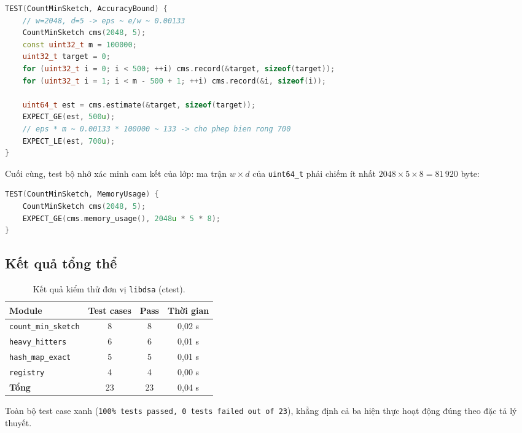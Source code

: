 \begin{lstlisting}[language=C++, caption={Xác nhận biên $(\varepsilon, \delta)$}, label=lst:test-bound]
TEST(CountMinSketch, AccuracyBound) {
    // w=2048, d=5 -> eps ~ e/w ~ 0.00133
    CountMinSketch cms(2048, 5);
    const uint32_t m = 100000;
    uint32_t target = 0;
    for (uint32_t i = 0; i < 500; ++i) cms.record(&target, sizeof(target));
    for (uint32_t i = 1; i < m - 500 + 1; ++i) cms.record(&i, sizeof(i));

    uint64_t est = cms.estimate(&target, sizeof(target));
    EXPECT_GE(est, 500u);
    // eps * m ~ 0.00133 * 100000 ~ 133 -> cho phep bien rong 700
    EXPECT_LE(est, 700u);
}
\end{lstlisting}

Cuối cùng, test bộ nhớ xác minh cam kết của lớp: ma trận $w \times d$ của \texttt{uint64\_t} phải chiếm ít nhất $2048 \times 5 \times 8 = 81\,920$ byte:

\begin{lstlisting}[language=C++, caption={Xác nhận memory usage}, label=lst:test-mem]
TEST(CountMinSketch, MemoryUsage) {
    CountMinSketch cms(2048, 5);
    EXPECT_GE(cms.memory_usage(), 2048u * 5 * 8);
}
\end{lstlisting}

\subsection{Kết quả tổng thể}

\begin{table}[H]
  \centering
  \caption{Kết quả kiểm thử đơn vị \texttt{libdsa} (ctest).}
  \label{tab:ctest-results}
  \begin{tabular}{@{}l c c c@{}}
    \toprule
    \textbf{Module} & \textbf{Test cases} & \textbf{Pass} & \textbf{Thời gian} \\
    \midrule
    \texttt{count\_min\_sketch} & 8  & 8  & 0{,}02 s \\
    \texttt{heavy\_hitters}     & 6  & 6  & 0{,}01 s \\
    \texttt{hash\_map\_exact}   & 5  & 5  & 0{,}01 s \\
    \texttt{registry}           & 4  & 4  & 0{,}00 s \\
    \midrule
    \textbf{Tổng}               & 23 & 23 & 0{,}04 s \\
    \bottomrule
  \end{tabular}
\end{table}

Toàn bộ test case xanh (\texttt{100\% tests passed, 0 tests failed out of 23}), khẳng định cả ba hiện thực hoạt động đúng theo đặc tả lý thuyết.

